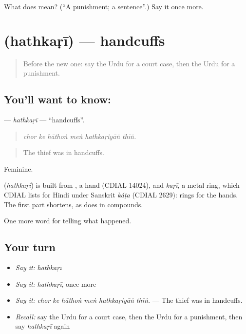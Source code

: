\begin{tcolorbox}[breakable,colback=teal!4,colframe=teal!35!black,title={Before you move on}]
What does  mean? (\textquotedblleft{}A punishment; a sentence\textquotedblright{}.) Say it once more.
\end{tcolorbox}
\section[\texorpdfstring{\ur{ہتھکڑی} (hathkaṛī)}{ہتھکڑی (hathkaṛī)}]{ (hathkaṛī) — handcuffs}

\label{lesson:UR-C283-hathkari}



\begin{quote}
Before the new one: say the Urdu for a court case, then the Urdu for a punishment.
\end{quote}

\subsection*{You'll want to know: }
\textbf{} — \emph{hathkaṛī} — \textquotedblleft{}handcuffs\textquotedblright{}.

\begin{quote}
     
\end{quote}

\begin{quote}
\emph{chor ke hāthoṅ meṅ hathkaṛiyāṅ thīṅ.}
\end{quote}

\begin{quote}
The thief was in handcuffs.
\end{quote}

Feminine.

\begin{cousinweb}
\textbf{} (\emph{hathkaṛī}) is built from \textbf{}, a hand (CDIAL 14024), and \emph{kaṛī}, a metal ring, which CDIAL lists for Hindi under Sanskrit \emph{káṭa} (CDIAL 2629): rings for the hands. The first part shortens, as \textbf{} does in compounds.
\end{cousinweb}

\begin{grammarlens}[title={What you've built}]
One more word for telling what happened.
\end{grammarlens}

\subsection*{Your turn}
\begin{itemize}
\raggedright
  \item \emph{Say it:} \emph{hathkaṛī}
  \item \emph{Say it:} \emph{hathkaṛī}, once more
  \item \emph{Say it:} \emph{chor ke hāthoṅ meṅ hathkaṛiyāṅ thīṅ.} — The thief was in handcuffs.
  \item \emph{Recall:} say the Urdu for a court case, then the Urdu for a punishment, then say \emph{hathkaṛī} again
\end{itemize}

